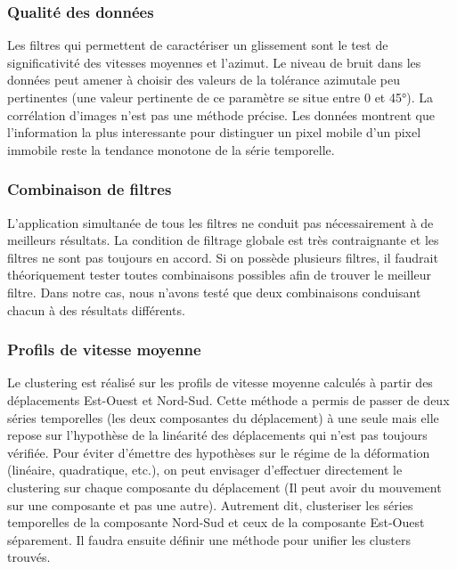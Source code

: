 \documentclass[11pt, openany]{report}
\begin{document}
\subsubsection{Qualité des données}
Les filtres qui permettent de caractériser un glissement  sont le test de significativité des vitesses moyennes et l'azimut. Le niveau de bruit dans les données peut amener à choisir des valeurs de la tolérance azimutale peu pertinentes (une valeur pertinente de ce paramètre se situe entre 0 et 45°). La corrélation d'images n'est pas une méthode précise. Les données montrent que l'information la plus interessante pour distinguer un pixel mobile d'un pixel immobile reste la tendance monotone de la série temporelle.

\subsubsection{Combinaison de filtres}
L'application simultanée de tous les filtres ne conduit pas nécessairement à de meilleurs résultats. La  condition de filtrage globale est très contraignante et les filtres ne sont pas toujours en accord. Si on possède plusieurs filtres, il faudrait théoriquement tester toutes combinaisons possibles afin de trouver le meilleur filtre. Dans notre cas, nous n'avons testé que deux combinaisons conduisant chacun à des résultats différents.

\subsubsection{Profils de vitesse moyenne}
Le clustering est réalisé sur les profils de vitesse moyenne calculés à partir des déplacements Est-Ouest et Nord-Sud. Cette méthode a permis de passer de deux séries temporelles (les deux composantes du déplacement) à une seule mais elle repose sur l'hypothèse de la linéarité des déplacements qui n'est pas toujours vérifiée. Pour éviter d'émettre des hypothèses sur le régime de la déformation (linéaire, quadratique, etc.), on peut envisager d'effectuer directement le clustering sur chaque composante du déplacement (Il peut avoir du mouvement sur une composante et pas une autre). Autrement dit, clusteriser les séries temporelles de la composante Nord-Sud et ceux de la composante Est-Ouest séparement. Il faudra ensuite définir une méthode pour unifier les clusters trouvés. 
\end{document}
